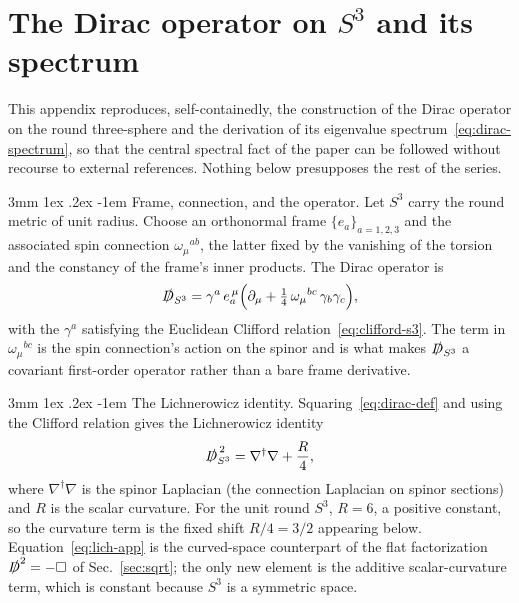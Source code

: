 \documentclass[%
 reprint, amsmath,amssymb, aps, prb, ]{revtex4-2}
\makeatletter
\numberwithin{equation}{section}
\renewcommand\paragraph{%
  \@startsection{paragraph}{4}{\z@}%
    {3mm \@plus 1ex \@minus .2ex}%
    {-1em}%
    {\normalfont\normalsize\itshape}}
\newcommand{\Dslash}{\slashed{D}}
\makeatother
\begin{document}
\section{The Dirac operator on $S^{3}$ and its spectrum}
\label{app:dirac}

This appendix reproduces, self-containedly, the construction of the Dirac operator on the round three-sphere and the derivation of its eigenvalue spectrum~\eqref{eq:dirac-spectrum}, so that the central spectral fact of the paper can be followed without recourse to external references. Nothing below presupposes the rest of the series.

\paragraph{Frame, connection, and the operator.}
Let $S^{3}$ carry the round metric of unit radius. Choose an orthonormal frame $\{e_{a}\}_{a=1,2,3}$ and the associated spin connection $\omega_{\mu}{}^{ab}$, the latter fixed by the vanishing of the torsion and the constancy of the frame's inner products. The Dirac operator is
\begin{equation}
\label{eq:dirac-def}
\Dslash_{S^{3}} = \gamma^{a}\,e_{a}^{\,\mu}\Big(\partial_{\mu} + \tfrac{1}{4}\,\omega_{\mu}{}^{bc}\,\gamma_{b}\gamma_{c}\Big),
\end{equation}
with the $\gamma^{a}$ satisfying the Euclidean Clifford relation~\eqref{eq:clifford-s3}. The term in $\omega_{\mu}{}^{bc}$ is the spin connection's action on the spinor and is what makes $\Dslash_{S^{3}}$ a covariant first-order operator rather than a bare frame derivative.

\paragraph{The Lichnerowicz identity.}
Squaring~\eqref{eq:dirac-def} and using the Clifford relation gives the Lichnerowicz identity
\begin{equation}
\label{eq:lich-app}
\Dslash_{S^{3}}^{\,2} = \nabla^{\dagger}\nabla + \frac{R}{4},
\end{equation}
where $\nabla^{\dagger}\nabla$ is the spinor Laplacian (the connection Laplacian on spinor sections) and $R$ is the scalar curvature. For the unit round $S^{3}$, $R = 6$, a positive constant, so the curvature term is the fixed shift $R/4 = 3/2$ appearing below. Equation~\eqref{eq:lich-app} is the curved-space counterpart of the flat factorization $\Dslash^{2}=-\Box$ of Sec.~\ref{sec:sqrt}; the only new element is the additive scalar-curvature term, which is constant because $S^{3}$ is a symmetric space.
\end{document}
